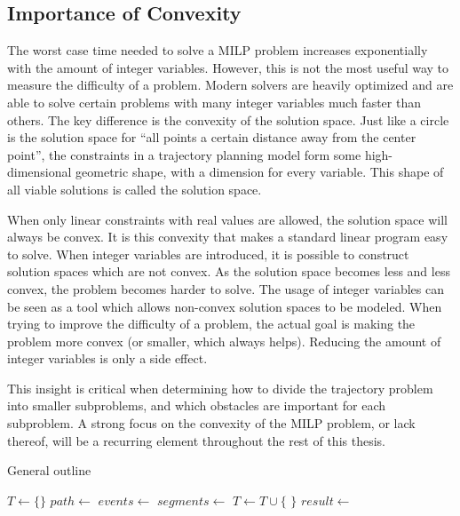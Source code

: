 \subsection{Importance of Convexity}
The worst case time needed to solve a MILP problem increases exponentially with the amount of integer variables. However, this is not the most useful way to measure the difficulty of a problem. Modern solvers are heavily optimized and are able to solve certain problems with many integer variables much faster than others. The key difference is the convexity of the solution space. Just like a circle is the solution space for ``all points a certain distance away from the center point'', the constraints in a trajectory planning model form some high-dimensional geometric shape, with a dimension for every variable. This shape of all viable solutions is called the solution space.
\par
When only linear constraints with real values are allowed, the solution space will always be convex. It is this convexity that makes a standard linear program easy to solve. When integer variables are introduced, it is possible to construct solution spaces which are not convex. As the solution space becomes less and less convex, the problem becomes harder to solve. The usage of integer variables can be seen as a tool which allows non-convex solution spaces to be modeled. When trying to improve the difficulty of a problem, the actual goal is making the problem more convex (or smaller, which always helps). Reducing the amount of integer variables is only a side effect.
\par
This insight is critical when determining how to divide the trajectory problem into smaller subproblems, and which obstacles are important for each subproblem. A strong focus on the convexity of the MILP problem, or lack thereof, will be a recurring element throughout the rest of this thesis.
\newpage
\begin{algorithm}[t]
\caption{General outline}
\label{alg:outline}
\begin{algorithmic}[1]
\State $T \leftarrow \{\}$ 
\State $path \leftarrow$ 
\State $events \leftarrow$ 
\State $segments \leftarrow$ 
\State {}
\State {}
\State {}
\State $T \leftarrow T \cup \{$  $\}$
\EndFor
\State $result \leftarrow $
\end{algorithmic}
\end{algorithm}

